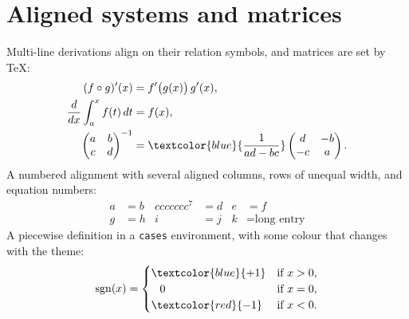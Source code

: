 \section*{Aligned systems and matrices}
Multi-line derivations align on their relation symbols, and matrices are set
by \TeX:
\begin{align*}
  (f \circ g)'(x) &= f'\bigl(g(x)\bigr)\,g'(x), \\
  \frac{d}{dx} \int_{a}^{x} f(t)\,dt &= f(x), \\
  \begin{pmatrix} a & b \\ c & d \end{pmatrix}^{-1}
    &= \textcolor{blue}{\frac{1}{ad - bc}}\begin{pmatrix} d & -b \\ -c & a \end{pmatrix}.
\end{align*}
A numbered alignment with several aligned columns, rows of unequal width,
and equation numbers:
\begin{align}
  a&=b & ccccccc^7&=d & e&=f \\
  g&=h & i&=j & k&=\text{long entry}
\end{align}
A piecewise definition in a \texttt{cases} environment, with some colour that
changes with the theme:
\[
  \operatorname{sgn}(x) =
  \begin{cases}
    \textcolor{blue}{+1} & \text{if } x > 0, \\
    \phantom{+}0 & \text{if } x = 0, \\
    \textcolor{red}{-1} & \text{if } x < 0.
  \end{cases}
\]
